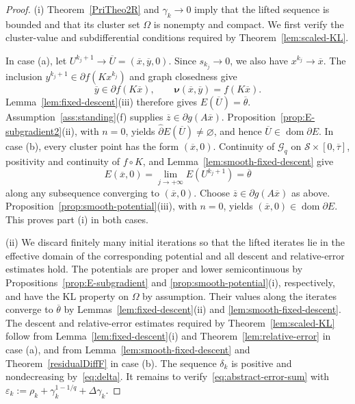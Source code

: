\documentclass[9pt]{article}
\numberwithin{equation}{section}
\theoremstyle{definition}
\theoremstyle{remark}
\newcommand{\Sset}{\mathcal S}
\newcommand{\whpartial}{\widehat\partial}
\newcommand{\Gcal}{\mathcal G}
\newcommand{\nuf}{\boldsymbol\nu}
\DeclareMathOperator{\dom}{dom}
\begin{document}
\begin{proof}
(i) Theorem~\ref{PriTheo2R} and $\gamma_k\to0$ imply that the lifted
sequence is bounded and that its cluster set $\Omega$ is nonempty
and compact. We first verify the cluster-value and subdifferential
conditions required by Theorem~\ref{lem:scaled-KL}.

In case (a), let
$U^{k_j+1}\to\overline U=(\overline x,\overline y,0)$.
Since $s_{k_j}\to0$, we also have $x^{k_j}\to\overline x$.
The inclusion $y^{k_j+1}\in\partial f(Kx^{k_j})$ and graph
closedness give
\[
 \overline y\in\partial f(K\overline x),\qquad
 \nuf(\overline x,\overline y)=f(K\overline x).
\]
Lemma~\ref{lem:fixed-descent}(iii) therefore gives
$E(\overline U)=\overline\theta$.
Assumption~\ref{ass:standing}(f) supplies
$\overline z\in\partial g(A\overline x)$.
Proposition~\ref{prop:E-subgradient2}(ii), with $n=0$, yields
$\whpartial E(\overline U)\neq\varnothing$, and hence
$\overline U\in\dom\partial E$.
In case (b), every cluster point has the form $(\overline x,0)$.
Continuity of $\Gcal_q$ on $\Sset\times[0,\overline\tau]$,
positivity and continuity of $f\circ K$, and
Lemma~\ref{lem:smooth-fixed-descent} give
\[
 E(\overline x,0)
 =\lim_{j\to+\infty} E(U^{k_j+1})=\overline\theta
\]
along any subsequence converging to $(\overline x,0)$.
Choose $\overline z\in\partial g(A\overline x)$ as above.
Proposition~\ref{prop:smooth-potential}(iii), with $n=0$, yields
$(\overline x,0)\in\dom\partial E$.
This proves part (i) in both cases.

(ii) We discard finitely many initial iterations 
so that the lifted iterates lie in the effective domain of
 the corresponding potential and all descent and relative-error estimates hold.
The potentials are proper and lower semicontinuous by
Propositions~\ref{prop:E-subgradient} and
\ref{prop:smooth-potential}(i), respectively, and have the KL property
on $\Omega$ by assumption. Their values along the iterates converge
to $\overline\theta$ by Lemmas~\ref{lem:fixed-descent}(ii) and
\ref{lem:smooth-fixed-descent}.
The descent and relative-error estimates required by
Theorem~\ref{lem:scaled-KL} follow from
Lemma~\ref{lem:fixed-descent}(i) and
Theorem~\ref{lem:relative-error} in case (a), and from
Lemma~\ref{lem:smooth-fixed-descent} and
Theorem~\ref{residualDiffF} in case (b).
The sequence $\delta_k$ is positive and nondecreasing
by~\eqref{eq:delta}.
It remains to verify~\eqref{eq:abstract-error-sum} with
$
 \varepsilon_k:=\rho_k+\gamma_k^{1-1/q}+\Delta\gamma_k.$


\end{proof}
\end{document}
